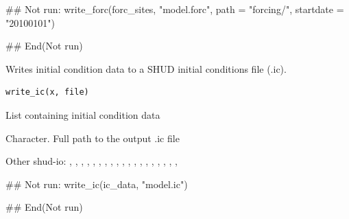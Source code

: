 \documentclass[a4paper]{book}
\begin{document}
%
\begin{Examples}
\begin{ExampleCode}
## Not run: 
write_forc(forc_sites, "model.forc", path = "forcing/", startdate = "20100101")

## End(Not run)
\end{ExampleCode}
\end{Examples}
%
\begin{Description}\relax
Writes initial condition data to a SHUD initial conditions file (.ic).
\end{Description}
%
\begin{Usage}
\begin{verbatim}
write_ic(x, file)
\end{verbatim}
\end{Usage}
%
\begin{Arguments}
\begin{ldescription}
\item[\code{x}] List containing initial condition data

\item[\code{file}] Character. Full path to the output .ic file
\end{ldescription}
\end{Arguments}
%
\begin{SeeAlso}\relax
Other shud-io: 
,
,
,
,
,
,
,
,
,
,
,
,
,
,
,
,
,
,
,
\end{SeeAlso}
%
\begin{Examples}
\begin{ExampleCode}
## Not run: 
write_ic(ic_data, "model.ic")

## End(Not run)
\end{ExampleCode}
\end{Examples}
\end{document}
